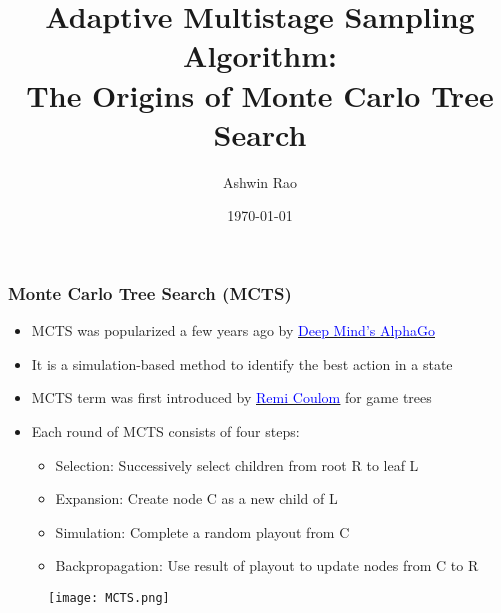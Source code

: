 \documentclass[handout]{beamer}
\title[Adaptive Multistage Sampling]{Adaptive Multistage Sampling Algorithm: \\ The Origins of Monte Carlo Tree Search} %
\author{Ashwin Rao} %
\institute[Stanford] %
{
ICME, Stanford University
}
\date{\today} %
\begin{document}
\begin{frame}
\titlepage %
\end{frame}

\begin{frame}
\frametitle{Monte Carlo Tree Search (MCTS)}
\pause
\begin{itemize}[<+->]
\item MCTS was popularized a few years ago by \href{https://www.nature.com/articles/nature16961}{\underline{\textcolor{blue}{Deep Mind's AlphaGo}}}
\item It is a simulation-based method to identify the best action in a state
\item MCTS term was first introduced by \href{https://hal.inria.fr/inria-00116992/document}{\underline{\textcolor{blue}{Remi Coulom}}} for game trees
\item Each round of MCTS consists of four steps:
\begin{itemize}
\item Selection: Successively select children from root R to leaf L
\item Expansion: Create node C as a new child of L
\item Simulation: Complete a random playout from C
\item Backpropagation: Use result of playout to update nodes from C to R
\end{itemize}
\end{itemize}
\begin{figure}
\texttt{[image: MCTS.png]}
\end{figure}
\end{frame}
\end{document}
